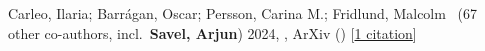 \item[{\color{numcolor}\scriptsize1}] Carleo, Ilaria; Barr{\'a}gan, Oscar; Persson, Carina M.; Fridlund, Malcolm \etal\ ({67} other co-authors, incl.\ \textbf{Savel, Arjun}) 2024, , ArXiv () [\href{https://ui.adsabs.harvard.edu/abs/2024arXiv240805612C}{1 citation}]